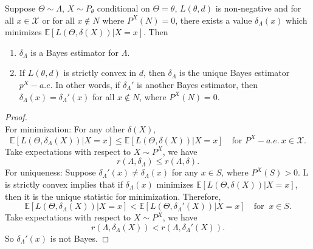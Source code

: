 \documentclass[a4paper]{article}
\begin{document}
\begin{thm}
	Suppose $\Theta \sim \Lambda$, $X \sim P_\theta$ conditional on $\Theta=\theta$, $L(\theta,d)$ is non-negative and for all $x \in \mathcal{X}$ or for all $x \notin N$ where $P^{X}(N)=0$, there exists a value $\delta_{\Lambda}(x)$ which minimizes $\mathbb{E}[L(\Theta,\delta(X))|X=x]$. Then
	\begin{enumerate}
		\item $\delta_{\Lambda}$ is a Bayes estimator for $\Lambda$.
		\item If $L(\theta,d)$ is strictly convex in $d$, then $\delta_{\Lambda}$ is the unique Bayes estimator $p^{X} - a.e.$ In other words, if $\delta_{\Lambda}'$ is another Bayes estimator, then $\delta_{\Lambda}(x)=\delta_{\Lambda}'(x)$ for all $x \notin N$, where $P^{X}(N)=0$.
	\end{enumerate}
\end{thm}

\begin{proof}
	\quad \\
	For minimization: For any other $\delta(X)$,
	\begin{equation}
		\mathbb{E}[L(\Theta,\delta_{\Lambda}(X))|X=x] \leq \mathbb{E}[L(\Theta,\delta(X))|X=x] \quad \text{for } P^X - a.e. \ x \in \mathcal{X}.
	\end{equation}
	Take expectations with respect to $X \sim P^X$, we have
	\begin{equation}
		r(\Lambda,\delta_{\Lambda}) \leq r(\Lambda,\delta).
	\end{equation}
	For uniqueness: Suppose $\delta_{\Lambda}'(x) \neq \delta_{\Lambda}(x)$ for any $x \in S$, where $P^X(S) > 0$. L is strictly convex implies that if $\delta_{\Lambda}(x)$ minimizes $\mathbb{E}[L(\Theta,\delta(X))|X=x]$, then it is the unique statistic for minimization. Therefore,
	\begin{equation}
		\mathbb{E}[L(\Theta,\delta_{\Lambda}(X))|X=x] < \mathbb{E}[L(\Theta,\delta_{\Lambda}'(X))|X=x] \quad \text{for } \ x \in S.
	\end{equation}
	Take expectations with respect to $X \sim P^X$, we have
	\begin{equation}
		r(\Lambda,\delta_{\Lambda}(X)) < r(\Lambda,\delta_{\Lambda}'(X)).
	\end{equation}
	So $\delta_{\Lambda}'(x)$ is not Bayes.
\end{proof}
\end{document}
